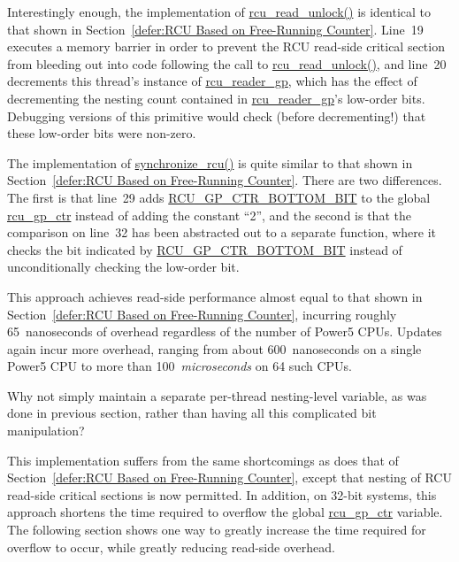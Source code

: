 Interestingly enough, the implementation of \url{rcu_read_unlock()}
is identical to that shown in
Section~\ref{defer:RCU Based on Free-Running Counter}.
Line~19 executes a memory barrier in order to prevent the RCU read-side
critical section from bleeding out into code following the call
to \url{rcu_read_unlock()}, and
line~20 decrements this thread's instance of \url{rcu_reader_gp},
which has the effect of decrementing the nesting count contained in
\url{rcu_reader_gp}'s low-order bits.
Debugging versions of this primitive would check (before decrementing!)
that these low-order bits were non-zero.

The implementation of \url{synchronize_rcu()} is quite similar to
that shown in
Section~\ref{defer:RCU Based on Free-Running Counter}.
There are two differences.
The first is that line~29 adds \url{RCU_GP_CTR_BOTTOM_BIT}
to the global \url{rcu_gp_ctr} instead of adding the constant ``2'',
and the second is that the comparison on line~32 has been abstracted
out to a separate function, where it checks the bit indicated
by \url{RCU_GP_CTR_BOTTOM_BIT} instead of unconditionally checking
the low-order bit.

This approach achieves read-side performance almost equal to that
shown in
Section~\ref{defer:RCU Based on Free-Running Counter}, incurring
roughly 65~nanoseconds of overhead regardless of the number of
Power5 CPUs.
Updates again incur more overhead, ranging from about 600~nanoseconds on
a single Power5 CPU to more than 100~\emph{microseconds} on 64
such CPUs.

\QuickQuiz{}
	Why not simply maintain a separate per-thread nesting-level
	variable, as was done in previous section, rather than having
	all this complicated bit manipulation?
 \QuickQuizEnd

This implementation suffers from the same shortcomings as does that of
Section~\ref{defer:RCU Based on Free-Running Counter}, except that
nesting of RCU read-side critical sections is now permitted.
In addition, on 32-bit systems, this approach shortens the time
required to overflow the global \url{rcu_gp_ctr} variable.
The following section shows one way to greatly increase the time
required for overflow to occur, while greatly reducing read-side
overhead.

